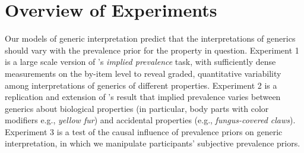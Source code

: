 \documentclass[floatsintext,doc]{apa6}
\begin{document}






\hypertarget{overview-of-experiments}{%
\section{Overview of Experiments}\label{overview-of-experiments}}

Our models of generic interpretation predict that the interpretations of generics should vary with the prevalence prior for the property in question.
Experiment 1 is a large scale version of 's \emph{implied prevalence} task, with sufficiently dense measurements on the by-item level to reveal graded, quantitative variability among interpretations of generics of different properties. 
Experiment 2 is a replication and extension of 's result that implied prevalence varies between generics about biological properties (in particular, body parts with color modifiers e.g., \emph{yellow fur}) and accidental properties (e.g., \emph{fungus-covered claws}).
Experiment 3 is a test of the causal influence of prevalence priors on generic interpretation, in which we manipulate participants' subjective prevalence priors.
\end{document}
